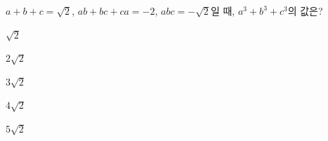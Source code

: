 $a+b+c=\sqrt{2}$, $ab+bc+ca=-2$, $abc=-\sqrt{2}$일 때, $a^3+b^3+c^3$의 값은?
\begin{choices32}{\rule[-3ex]{0pt}{8ex}$\sqrt{2}$}{\rule[-3ex]{0pt}{8ex}$2\sqrt{2}$}{\rule[-3ex]{0pt}{8ex}$3\sqrt{2}$}{\rule[-3ex]{0pt}{8ex}$4\sqrt{2}$}{\rule[-3ex]{0pt}{8ex}$5\sqrt{2}$}\end{choices32}
